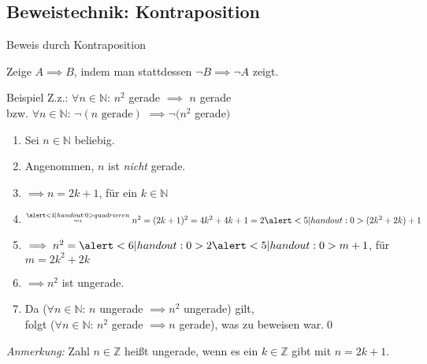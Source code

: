 \subsection{Beweistechnik: Kontraposition}
\begin{frame}[fragile]{Beweis durch Kontraposition}
	\begin{alertblock}{Zeige $A\implies B$, indem man stattdessen $\neg B \implies\neg A$ zeigt.}
	\end{alertblock}
	\begin{exampleblock}{Beispiel}
		Z.z.: \alert<7|handout:0>{\alert<1|handout:0>{$\forall n\in\mathbb{N}$:} $n^2$ gerade $\implies$\alert<2|handout:0>{ $n$ gerade}} \\
		\qquad bzw. \alert<1|handout:0>{$\forall n\in\mathbb{N}$:} \alert<2|handout:0>{$\neg(n \text{ gerade})$} $\implies \neg(n^2$ gerade$)$
		\begin{enumerate}
			\item\alert<1|handout:0>{Sei $n \in \mathbb{N}$ beliebig.}
			\item\alert<2|handout:0>{Angenommen, $n$ ist \emph{nicht} gerade.}
			\item\alert<3|handout:0>{$\implies n=2k+1$, für ein $k \in \mathbb{N}$}
			\item $\overset{\alert<4|handout:0>{quadrieren}}{\; \leadsto \;} n^2 = (2k+1)^2 = 4k^2+4k+1 = 2\alert<5|handout:0>{(2k^2+2k)}+1$
			\item $\implies n^2= \alert<6|handout:0>{2\alert<5|handout:0>{m}+1}$, für $m=2k^2+2k$
			\item $\implies n^2$ ist \alert<6|handout:0>{ungerade}.
			\item Da ($\forall n\in\mathbb{N}$: $n$ ungerade $\implies n^2$ ungerade) gilt, \\
			      folgt \alert<7|handout:0>{($\forall n\in\mathbb{N}$: $n^2$ gerade $\implies n$ gerade)}, was zu beweisen war.\qed\;
		\end{enumerate}
	\end{exampleblock}
	\vspace{-1em}
	\footnotesize{\alert<3,6|handout:0>{\emph{Anmerkung:}} Zahl $n\in\mathbb{Z}$ heißt ungerade, wenn es ein $k\in\mathbb{Z}$ gibt mit $n=2k+1$.}
\end{frame}

